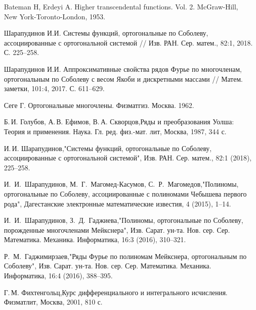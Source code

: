 \begin{thebibliography}{99}

{Bateman H, Erdeyi A.} Higher transcendental functions. Vol. 2. McGraw-Hill, New York-Toronto-London, 1953.


{Шарапудинов И.И.} Системы функций, ортогональные по Соболеву, ассоциированные с ортогональной системой // Изв. РАН. Сер. матем., 82:1, 2018. С. 225--258.


{Шарапудинов И.И.} Аппроксимативные свойства рядов Фурье по многочленам, ортогональным по Соболеву с весом Якоби и дискретными массами // Матем. заметки, 101:4, 2017. С. 611--629.


{Сеге Г.} Ортогональные многочлены. Физматгиз. Москва. 1962.


Б.\,И. Голубов, А.\,В. Ефимов, В.\,А. Скворцов,Ряды и преобразования Уолша: Теория и применения. Наука. Гл. ред. физ.-мат. лит, Москва, 1987, 344 с.


И.\,И. Шарапудинов,"Системы функций, ортогональные по Соболеву, ассоциированные с ортогональной системой", Изв. РАН. Сер. матем., 82:1 (2018), 225--258.


И.~И.~Шарапудинов, М.~Г.~Магомед-Касумов, С.~Р.~Магомедов,"Полиномы, ортогональные по Соболеву, ассоциированные с полиномами Чебышева первого рода", Дагестанские электронные математические известия, 4 (2015), 1--14.


И.~И.~Шарапудинов, З.~Д.~Гаджиева,"Полиномы, ортогональные по Соболеву, порожденные многочленами Мейкснера", Изв. Сарат. ун-та. Нов. сер. Сер. Математика. Механика. Информатика, 16:3 (2016), 310--321.


Р.~М.~Гаджимирзаев,"Ряды Фурье по полиномам Мейкснера, ортогональным по Соболеву", Изв. Сарат. ун-та. Нов. сер. Сер. Математика. Механика. Информатика, 16:4 (2016), 388--395.


Г.\,М. Фихтенгольц,Курс дифференциального и интегрального исчисления. Физматлит, Москва, 2001, 810 с.



\end{thebibliography}